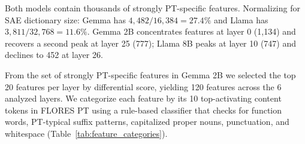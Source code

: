 \documentclass[runningheads]{llncs}
\begin{document}
\begin{table}[t]
\centering
\caption{Strongly PT-specific feature counts ($s > 2$) at each analyzed layer using pretrained SAEs (column headers indicate layer indices; Gemma 2B: layers 0, 5, 10, 15, 20, 25; Llama 8B: layers 0, 5, 10, 16, 21, 26). Both rows use padding-masked analysis: tokens identified as padding or BOS are excluded before computing per-feature mean activations. The differential activation score has a theoretical ceiling of $5/2 = 2.5$ (when a feature activates only on PT among the five languages, its score equals $\mathrm{mean}/\mathrm{std} = 2.5$).}
\label{tab:features}
\end{table}

Both models contain thousands of strongly PT-specific features. Normalizing for SAE dictionary size: Gemma has $4{,}482/16{,}384 = 27.4\%$ and Llama has $3{,}811/32{,}768 = 11.6\%$. Gemma 2B concentrates features at layer 0 (1,134) and recovers a second peak at layer 25 (777); Llama 8B peaks at layer 10 (747) and declines to 452 at layer 26.

From the set of strongly PT-specific features in Gemma 2B we selected the top 20 features per layer by differential score, yielding 120 features across the 6 analyzed layers. We categorize each feature by its 10 top-activating content tokens in FLORES PT using a rule-based classifier that checks for function words, PT-typical suffix patterns, capitalized proper nouns, punctuation, and whitespace (Table~\ref{tab:feature_categories}).
\end{document}
